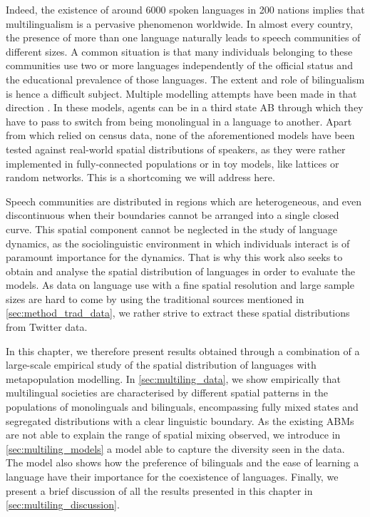 \documentclass[../thesis.tex]{subfiles}
\begin{document}
Indeed, the existence of around \SI{6000}{} spoken languages in 200 nations implies that
multilingualism is a pervasive phenomenon worldwide. In almost every country, the
presence of more than one language naturally leads to speech communities of different
sizes. A common situation is that many individuals belonging to these communities use
two or more languages independently of the official status and the educational
prevalence of those languages. The extent and role of bilingualism is hence a difficult
subject. Multiple modelling attempts have been made in that direction
\cite{CastelloOrderingDynamics2006,PatriarcaInfluenceGeography2009,PatriarcaModelingTwolanguage2012,VazquezAgentBased2010}.
In these models, agents can be in a third state AB through which they have to pass to
switch from being monolingual in a language to another. Apart from
\cite{ProchazkaQuantifyingDriving2017} which relied on census data, none of the
aforementioned models have been tested against real-world spatial distributions of
speakers, as they were rather implemented in fully-connected populations or in toy
models, like lattices or random networks. This is a shortcoming we will address here.

Speech communities are distributed in regions which are heterogeneous, and even
discontinuous when their boundaries cannot be arranged into a single closed curve. This
spatial component cannot be neglected in the study of language dynamics, as the
sociolinguistic environment in which individuals interact is of paramount importance for
the dynamics. That is why this work also seeks to obtain and analyse the spatial
distribution of languages in order to evaluate the models. As data on language use with
a fine spatial resolution and large sample sizes are hard to come by using the
traditional sources mentioned in \cref{sec:method_trad_data}, we rather strive to
extract these spatial distributions from Twitter data.

In this chapter, we therefore present results obtained through a combination of a
large-scale empirical study of the spatial distribution of languages with metapopulation
modelling.
In \cref{sec:multiling_data}, we show empirically that multilingual societies
are characterised by different spatial patterns in the populations of monolinguals and
bilinguals, encompassing fully mixed states and segregated distributions with a clear
linguistic boundary. As the existing \acp{ABM} are not able to explain the range of
spatial mixing observed, we introduce in \cref{sec:multiling_models} a model able to
capture the diversity seen in the data. The model also shows how the preference of
bilinguals and the ease of learning a language have their importance for the coexistence
of languages. Finally, we present a brief discussion of all the results presented in
this chapter in \cref{sec:multiling_discussion}.
\end{document}
